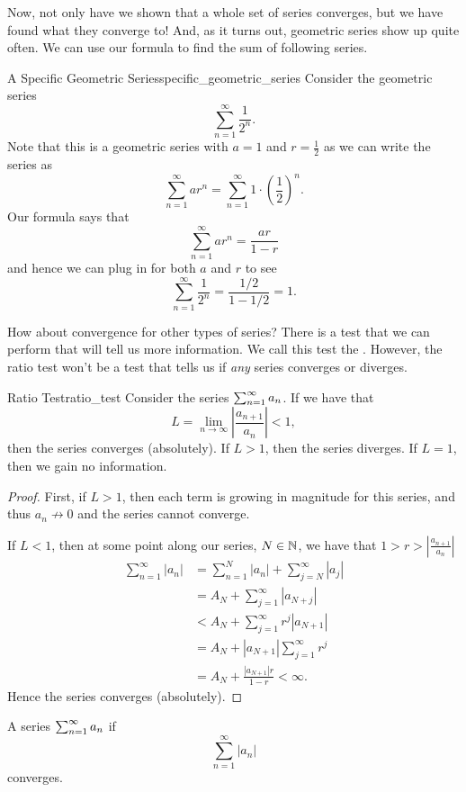 Now, not only have we shown that a whole set of series converges, but we have found what they converge to! And, as it turns out, geometric series show up quite often.  We can use our formula to find the sum of following series.

\begin{ex}{A Specific Geometric Series}{specific_geometric_series}
Consider the geometric series
\[
\sum_{n=1}^\infty \frac{1}{2^n}.
\]
Note that this is a geometric series with $a=1$ and $r=\frac{1}{2}$ as we can write the series as
\[
\sum_{n=1}^\infty a r^n = \sum_{n=1}^\infty 1\cdot \left( \frac{1}{2}\right)^n.
\]
Our formula says that
\[
\sum_{n=1}^\infty ar^n = \frac{ar}{1-r}
\]
and hence we can plug in for both $a$ and $r$ to see
\[
\boxed{\sum_{n=1}^\infty \frac{1}{2^n}=\frac{1/2}{1-1/2}=1.}
\]
\end{ex}

How about convergence for other types of series? There is a test that we can perform that will tell us more information.  We call this test the . However, the ratio test won't be a test that tells us if \emph{any} series converges or diverges.

\begin{prop}{Ratio Test}{ratio_test}
Consider the series $\sum_{n=1}^\infty a_n$. If we have that
\[
L=\lim_{n\to \infty}\left| \frac{a_{n+1}}{a_n}\right|<1,
\]
then the series converges (absolutely).  If $L>1$, then the series diverges.  If $L=1$, then we gain no information.
\begin{proof}
First, if $L>1$, then each term is growing in magnitude for this series, and thus $a_n\not\to 0$ and the series cannot converge.

If $L<1$, then at some point along our series, $N\in \mathbb{N}$, we have that $1>r>\left| \frac{a_{n+1}}{a_n}\right|$
\begin{align*}
\sum_{n=1}^\infty |a_n| &= \sum_{n=1}^N |a_n| + \sum_{j=N}^\infty |a_j|\\
&= A_N + \sum_{j=1}^\infty |a_{N+j}|\\
&< A_N + \sum_{j=1}^\infty r^j |a_{N+1}|\\
&= A_N +|a_{N+1}| \sum_{j=1}^\infty r^j\\
&= A_N + \frac{|a_{N+1}|r}{1-r}<\infty.
\end{align*}
Hence the series converges (absolutely).
\end{proof}
\end{prop}

\begin{remark}
A series $\sum_{n=1}^\infty a_n$  if
\[
\sum_{n=1}^\infty |a_n|
\]
converges.
\end{remark}

